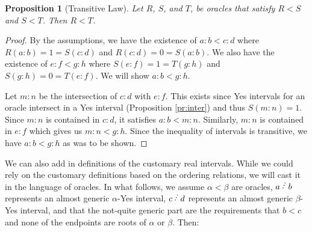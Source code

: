 \documentclass[12pt]{article}
\newtheorem{proposition}{Proposition}[subsection]
\begin{document}
\begin{proposition}[Transitive Law]\label{pr:transitive}
Let $R$, $S$, and $T$, be oracles that satisfy $R<S$ and $S < T$. Then $R < T$.
\end{proposition}

\begin{proof}
By the assumptions, we have the existence of $a:b < c:d$ where $R(a:b) = 1 = S(c:d)$ and $R(c:d) = 0 = S(a:b)$. We also have the existence of $e:f < g:h$ where $S(e:f) = 1 = T(g:h)$ and $S(g:h) = 0 = T(e:f)$. We will show $a:b < g:h$.

Let $m:n$ be the intersection of $c:d$ with $e:f$. This exists since Yes intervals for an oracle intersect in a Yes interval (Proposition \ref{pr:inter}) and thus $S(m:n) = 1$. Since $m:n$ is contained in $c:d$, it satisfies $a:b < m:n$. Similarly, $m:n$ is contained in $e:f$ which gives us $m:n < g:h$. Since the inequality of intervals is transitive, we have $a:b < g:h$ as was to be shown. 
\end{proof}

We can also add in definitions of the customary real intervals. While we could rely on the customary definitions based on the ordering relations, we will cast it in the language of oracles. In what follows, we assume $\alpha < \beta$ are oracles,  $a\lte b$ represents an almost generic $\alpha$-Yes interval, $c\lte d$ represents an almost generic $\beta$-Yes interval, and that the not-quite generic part are the requirements that $b < c$ and none of the endpoints are roots of $\alpha$ or $\beta$. Then: 
\end{document}
